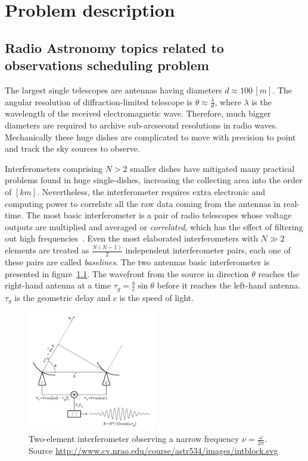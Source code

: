 \chapter{Problem description}
\section{Radio Astronomy topics related to observations scheduling problem}

The largest single telescopes are antennas having diameters $d\approx 100\,[m]$. The angular resolution of diffraction-limited telescope is $\theta \approx \frac{\lambda}{d}$, where $\lambda$ is the wavelength of the received electromagnetic wave. Therefore, much bigger diameters are required to archive sub-arcsecond resolutions in radio waves. Mechanically these huge dishes are complicated to move with precision to point and track the sky sources to observe.

Interferometers comprising $N > 2$ smaller dishes have mitigated many practical problems found in huge single-dishes, increasing the collecting area into the order of $[km]$. Nevertheless, the interferometer requires extra electronic and computing power to correlate all the raw data coming from the antennas in real-time.
The most basic interferometer is a pair of radio telescopes whose voltage outputs are multiplied and averaged or \textit{correlated}, which has the effect of filtering out high frequencies~\cite{thompson01}. Even the most elaborated interferometers with $N\gg2$ elements are treated as $\frac{N(N-1)}{2}$ independent interferometer pairs, each one of these pairs are called \textit{baselines}. The two antennas basic interferometer is presented in figure~\ref{fig:interferometer}. The wavefront from the source in direction $\theta$ reaches the right-hand antenna at a time $\tau_g = \frac{b}{c}\sin\theta$ before it reaches the left-hand antenna. $\tau_g$ is the geometric delay and $c$ is the speed of light.

\begin{figure}[htbp]
\centering
\includegraphics[width=0.5\textwidth]{images/intblock}
\caption[Two-element interferometer observing a narrow frequency $\nu=\frac{\omega}{2\pi}$]{Two-element interferometer observing a narrow frequency $\nu=\frac{\omega}{2\pi}$. Source \url{http://www.cv.nrao.edu/course/astr534/images/intblock.svg}}
\label{fig:interferometer}
\end{figure}

